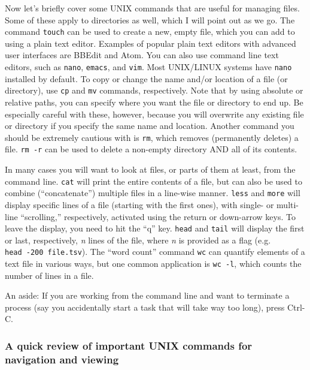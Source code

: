 \documentclass[]{book}
\begin{document}
Now let's briefly cover some UNIX commands that are useful for managing files. Some of these apply to directories as well, which I will point out as we go. The command \texttt{touch} can be used to create a new, empty file, which you can add to using a plain text editor. Examples of popular plain text editors with advanced user interfaces are BBEdit and Atom. You can also use command line text editors, such as \texttt{nano}, \texttt{emacs}, and \texttt{vim}. Most UNIX/LINUX systems have \texttt{nano} installed by default. To copy or change the name and/or location of a file (or directory), use \texttt{cp} and \texttt{mv} commands, respectively. Note that by using absolute or relative paths, you can specify where you want the file or directory to end up. Be especially careful with these, however, because you will overwrite any existing file or directory if you specify the same name and location. Another command you should be extremely cautious with is \texttt{rm}, which removes (permanently deletes) a file. \texttt{rm\ -r} can be used to delete a non-empty directory AND all of its contents.

In many cases you will want to look at files, or parts of them at least, from the command line. \texttt{cat} will print the entire contents of a file, but can also be used to combine (``concatenate'') multiple files in a line-wise manner. \texttt{less} and \texttt{more} will display specific lines of a file (starting with the first ones), with single- or multi-line ``scrolling,'' respectively, activated using the return or down-arrow keys. To leave the display, you need to hit the ``q'' key. \texttt{head} and \texttt{tail} will display the first or last, respectively, \emph{n} lines of the file, where \emph{n} is provided as a flag (e.g. \texttt{head\ -200\ file.tsv}). The ``word count'' command \texttt{wc} can quantify elements of a text file in various ways, but one common application is \texttt{wc\ -l}, which counts the number of lines in a file.

An aside: If you are working from the command line and want to terminate a process (say you accidentally start a task that will take way too long), press Ctrl-C.

\hypertarget{a-quick-review-of-important-unix-commands-for-navigation-and-viewing}{%
\subsubsection{A quick review of important UNIX commands for navigation and viewing}\label{a-quick-review-of-important-unix-commands-for-navigation-and-viewing}}
\end{document}
